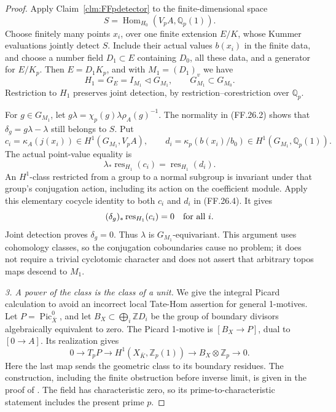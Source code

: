 \begin{proof}
Apply Claim~\ref{clm:FFpdetector} to the finite-dimensional
space
\[
                  S=\operatorname{Hom}_{H_0}
                       (V_pA,\mathbb Q_p(1)).
\]
Choose finitely many points \(x_i\), over one finite
extension \(E/K\), whose Kummer evaluations jointly
detect \(S\). Include their actual values \(b(x_i)\)
in the finite data, and choose a number field
\(D_1\subset E\) containing \(D_0\), all these data,
and a generator for \(E/K_p\). Then
\(E=D_1K_p\), and with \(M_1=(D_1)_v\) we have
\[
        H_1=G_E=I_{M_1}\triangleleft G_{M_1},
                  \qquad G_{M_1}\subset G_{M_0}.         \tag{FF.26.3}
\]
Restriction to \(H_1\) preserves joint detection,
by restriction--corestriction over \(\mathbb Q_p\).

For \(g\in G_{M_1}\), let
\(g\lambda=\chi_p(g)\lambda\rho_A(g)^{-1}\).
The normality in (FF.26.2) shows that
\(\delta_g=g\lambda-\lambda\) still belongs to \(S\).
Put
\[
 c_i=\kappa_A(j(x_i))\in H^1(G_{M_1},V_pA),\qquad
 d_i=\kappa_p(b(x_i)/b_0)\in H^1(G_{M_1},\mathbb Q_p(1)).
\]
The actual point-value equality is
\[
                \lambda_*\operatorname{res}_{H_1}(c_i)
                        =\operatorname{res}_{H_1}(d_i). \tag{FF.26.4}
\]
An \(H^1\)-class restricted from a group to a normal
subgroup is invariant under that group's conjugation
action, including its action on the coefficient module.
Apply this elementary cocycle identity to both \(c_i\)
and \(d_i\) in (FF.26.4). It gives
\[
               (\delta_g)_*\operatorname{res}_{H_1}(c_i)=0
                                      \quad\hbox{for all }i.
\]
Joint detection proves \(\delta_g=0\). Thus \(\lambda\)
is \(G_{M_1}\)-equivariant. This argument uses cohomology
classes, so the conjugation coboundaries cause no problem;
it does not require a trivial cyclotomic character and
does not assert that arbitrary topos maps descend to
\(M_1\).

\emph{3. A power of the class is the class of a unit.}
We give the integral Picard calculation to avoid an
incorrect local Tate-Hom assertion for general 1-motives.
Let \(P=\operatorname{Pic}^0_{\bar X}\), and let
\(B_X\subset\bigoplus_i\mathbb ZD_i\) be the group
of boundary divisors algebraically equivalent to zero.
The Picard 1-motive is \([B_X\to P]\), dual to
\([0\to A]\). Its realization gives
\[
 0\longrightarrow T_pP\longrightarrow
 H^1(X_{\bar K},\mathbb Z_p(1))\longrightarrow
 B_X\otimes\mathbb Z_p\longrightarrow0.                \tag{FF.26.5}
\]
Here the last map sends the geometric class to its
boundary residues. The construction, including the
finite obstruction before inverse limit, is given in
the proof of \citet[Proposition~4.1]{FF_SpiessSzamuely2003}.
The field has characteristic zero, so its prime-to-characteristic
statement includes the present prime \(p\).


\end{proof}
